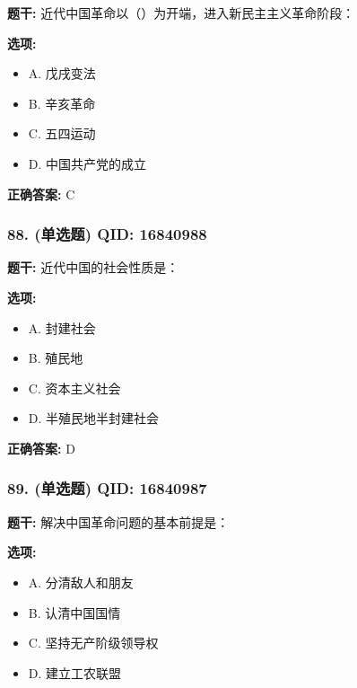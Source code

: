 \documentclass[12pt,UTF8]{ctexart}
\begin{document}
\textbf{题干:}
近代中国革命以（）为开端，进入新民主主义革命阶段：

\textbf{选项:}
\begin{itemize}[leftmargin=*]

  \item A. 戊戌变法

  \item B. 辛亥革命

  \item C. 五四运动

  \item D. 中国共产党的成立

\end{itemize}

\textbf{正确答案:}
C

\vspace{0.3em}\hrulefill\vspace{0.7em}

\subsubsection*{88. (单选题) \small QID: 16840988}

\textbf{题干:}
近代中国的社会性质是：

\textbf{选项:}
\begin{itemize}[leftmargin=*]

  \item A. 封建社会

  \item B. 殖民地

  \item C. 资本主义社会

  \item D. 半殖民地半封建社会

\end{itemize}

\textbf{正确答案:}
D

\vspace{0.3em}\hrulefill\vspace{0.7em}

\subsubsection*{89. (单选题) \small QID: 16840987}

\textbf{题干:}
解决中国革命问题的基本前提是：

\textbf{选项:}
\begin{itemize}[leftmargin=*]

  \item A. 分清敌人和朋友

  \item B. 认清中国国情

  \item C. 坚持无产阶级领导权

  \item D. 建立工农联盟

\end{itemize}
\end{document}
